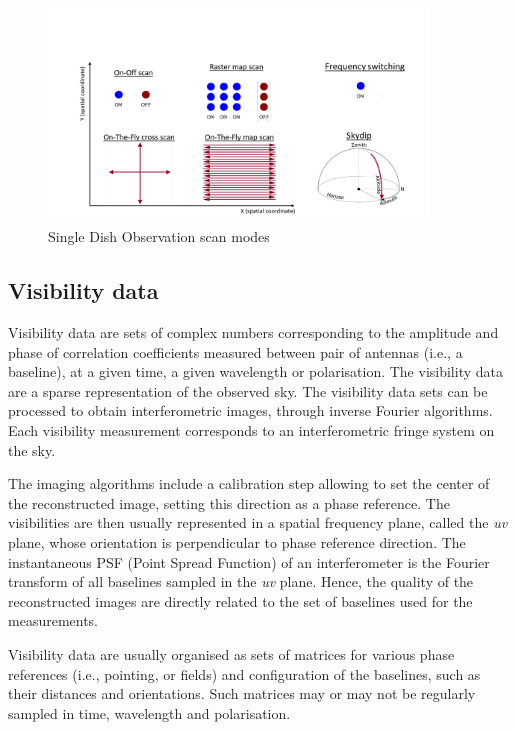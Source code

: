 \documentclass[11pt,a4paper]{ivoa}
\begin{document}
\begin{figure}[H]
\centering

\includegraphics[width=0.9\textwidth]{SingleDish.png}
\caption{Single Dish Observation scan modes}
\label{fig:SD}
\end{figure}



\subsection{Visibility data }
\label{sec:visibility}

Visibility data are sets of complex numbers corresponding to the amplitude and phase 
of correlation coefficients measured between pair of antennas (i.e., a baseline), at 
a given time, a given wavelength or polarisation. The visibility data are a sparse 
representation of the observed sky. The visibility data sets can be processed to obtain 
interferometric images, through inverse Fourier algorithms. Each visibility measurement 
corresponds to an interferometric fringe system on the sky. 

The imaging algorithms include a calibration step allowing to set the center of the 
reconstructed image, setting this direction as a phase reference. The visibilities
are then usually represented in a spatial frequency plane, called the \emph{uv} plane, 
whose orientation is perpendicular to phase reference direction. The instantaneous PSF 
(Point Spread Function) of an interferometer is the Fourier transform of all baselines 
sampled in the \emph{uv} plane. Hence, the quality of the reconstructed images are 
directly related to the set of baselines used for the measurements.

Visibility data are usually organised as sets of matrices for various phase references
(i.e., pointing, or fields) and configuration of the baselines, such as their
distances and orientations. Such matrices may or may not be regularly sampled in time, 
wavelength and polarisation.
    
\end{document}

